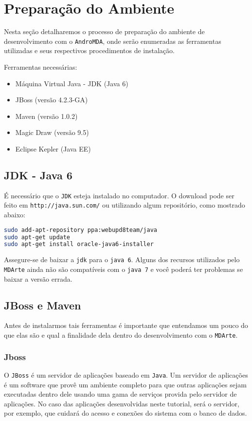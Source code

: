 \chapter{Preparação do Ambiente}

Nesta seção detalharemos o processo de preparação do ambiente de desenvolvimento
com o \texttt{AndroMDA}, onde serão enumeradas as ferramentas utilizadas e seus
respectivos procedimentos de instalação.

Ferramentas necessárias:
\begin{itemize}
  \item Máquina Virtual Java - JDK (Java 6)
  \item JBoss (versão 4.2.3-GA)
  \item Maven (versão 1.0.2) 
  \item Magic Draw (versão 9.5)
  \item Eclipse Kepler (Java EE)
\end{itemize}

\section{JDK - Java 6}

É necessário que o \texttt{JDK} esteja instalado no computador. O
download pode ser feito em \texttt{http://java.sun.com/} ou utilizando
algum repositório, como mostrado abaixo:

\begin{lstlisting}[language=bash]
sudo add-apt-repository ppa:webupd8team/java
sudo apt-get update
sudo apt-get install oracle-java6-installer
\end{lstlisting}

Assegure-se de baixar a \texttt{jdk} para o \texttt{java 6}. Alguns dos recursos
utilizados pelo \texttt{MDArte} ainda não são compatíveis com o \texttt{java 7}
e você poderá ter problemas se baixar a versão errada.

\section{JBoss e Maven}

Antes de instalarmos tais ferramentas é importante que entendamos um pouco do
que elas são e qual a finalidade dela dentro do desenvolvimento com o
\texttt{MDArte}.

\subsection{Jboss}
O \texttt{JBoss} é um servidor de aplicações baseado em \texttt{Java}. Um
servidor de aplicações é um software que provê um ambiente completo para que outras
aplicações sejam executadas dentro dele usando uma gama de serviços provida pelo
servidor de aplicações. No caso das aplicações desenvolvidas neste tutorial,
será o servidor, por exemplo, que cuidará do acesso e conexões do sistema com o
banco de dados.

